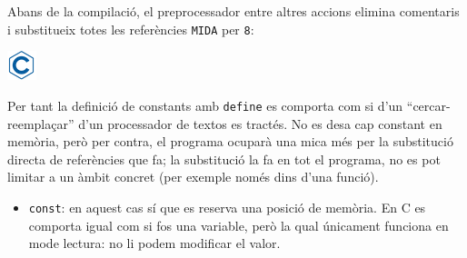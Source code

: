 \documentclass[]{book}
\newenvironment{Shaded}{\begin{snugshade}}{\end{snugshade}}
\newcommand{\DataTypeTok}[1]{\textcolor[rgb]{0.13,0.29,0.53}{#1}}
\newcommand{\DecValTok}[1]{\textcolor[rgb]{0.00,0.00,0.81}{#1}}
\newcommand{\CharTok}[1]{\textcolor[rgb]{0.31,0.60,0.02}{#1}}
\newcommand{\SpecialCharTok}[1]{\textcolor[rgb]{0.00,0.00,0.00}{#1}}
\newcommand{\StringTok}[1]{\textcolor[rgb]{0.31,0.60,0.02}{#1}}
\newcommand{\ImportTok}[1]{#1}
\newcommand{\ControlFlowTok}[1]{\textcolor[rgb]{0.13,0.29,0.53}{\textbf{#1}}}
\newcommand{\PreprocessorTok}[1]{\textcolor[rgb]{0.56,0.35,0.01}{\textit{#1}}}
\newcommand{\NormalTok}[1]{#1}
\providecommand{\tightlist}{%
  \setlength{\itemsep}{0pt}\setlength{\parskip}{0pt}}
\begin{document}
Abans de la compilació, el preprocessador entre altres accions elimina
comentaris i substitueix totes les referències \texttt{MIDA} per
\texttt{8}:

\includegraphics{./img/c.png}

\begin{Shaded}
\end{Shaded}

Per tant la definició de constants amb \texttt{define} es comporta com
si d'un ``cercar-reemplaçar'' d'un processador de textos es tractés. No
es desa cap constant en memòria, però per contra, el programa ocuparà
una mica més per la substitució directa de referències que fa; la
substitució la fa en tot el programa, no es pot limitar a un àmbit
concret (per exemple només dins d'una funció).

\begin{itemize}
\tightlist
\item
  \texttt{const}: en aquest cas sí que es reserva una posició de
  memòria. En C es comporta igual com si fos una variable, però la qual
  únicament funciona en mode lectura: no li podem modificar el valor.
\end{itemize}
\end{document}
